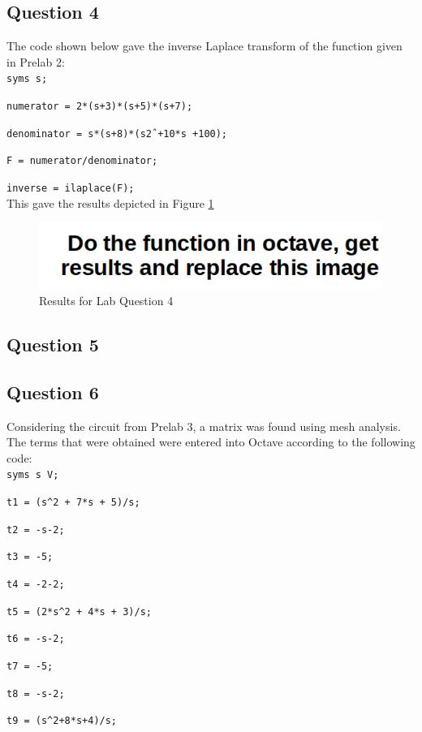\documentclass[12pt, a4paper]{article}
\begin{document}
	\subsection{Question 4}
	The code shown below gave the inverse Laplace transform of the function given in Prelab 2:\\

	\texttt{syms s;}\par
  	\texttt{numerator = 2*(s+3)*(s+5)*(s+7);}\par
  	\texttt{denominator = s*(s+8)*(s\^2 +10*s +100);}\par
  	\texttt{F = numerator/denominator;}\par
  	\texttt{inverse = ilaplace(F);}\\

  	This gave the results depicted in Figure \ref{fig:question_4} \\


	\begin{figure}[H]
		\centering
		\includegraphics[width=\textwidth]{question_4}
		\caption{Results for Lab Question 4}
		\label{fig:question_4}
	\end{figure}


	\subsection{Question 5}

	\subsection{Question 6}
	Considering the circuit from Prelab 3, a matrix was found using mesh analysis. The terms that were obtained were entered into Octave according to the following code:\\

	\texttt{syms s V;} \par
	\texttt{t1 = (s\^{}2 + 7*s + 5)/s;}\par
	\texttt{t2 = -s-2;}\par
	\texttt{t3 = -5;}\par
	\texttt{t4 = -2-2;}\par
	\texttt{t5 = (2*s\^{}2 + 4*s + 3)/s;}\par
	\texttt{t6 = -s-2;}\par
	\texttt{t7 = -5;}\par
	\texttt{t8 = -s-2;}\par
	\texttt{t9 = (s\^{}2+8*s+4)/s;}\\
\end{document}
